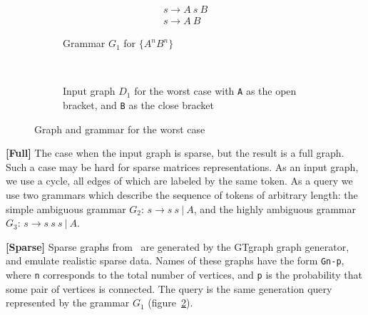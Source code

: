 \begin{figure}[h]
    \centering
    \begin{subfigure}[b]{0.20\textwidth}
        \centering
        \[
         \begin{array}{l}
           s \rightarrow A \ s \ B \\
           s \rightarrow A \ B
         \end{array}
         \]
        \caption{Grammar $G_1$ for $\{A^n B^n\}$}
    \end{subfigure}%
    ~\quad
    \begin{subfigure}[b]{0.24\textwidth}
        \centering

        \caption{Input graph $D_1$ for the worst case with \texttt{A} as the open bracket, and \texttt{B} as the close bracket}
        \label{fig:worstCaseGraph}
    \end{subfigure}%
    \caption{Graph and grammar for the worst case}
    \label{fig:grammar_example}
\end{figure}


\textbf{[Full]} The case when the input graph is sparse, but the result is a full graph.
Such a case may be hard for sparse matrices representations.
As an input graph, we use a cycle, all edges of which are labeled by the same token.
As a query we use two grammars which describe the sequence of tokens of arbitrary length: the simple ambiguous grammar $G_2$: $s \rightarrow  s \ s \ | \ A$,  and the highly ambiguous grammar $G_3$: $s \rightarrow s \ s \ s \ | \ A$.

\textbf{[Sparse]} Sparse graphs from~\cite{fan2018scaling} are generated by the GTgraph graph generator, and emulate realistic sparse data.
Names of these graphs have the form \texttt{Gn-p}, where \texttt{n} corresponds to the total number of vertices, and \texttt{p} is the probability that some pair of vertices is connected.
The query is the same generation query represented by the grammar $G_1$ (figure~\ref{fig:grammar_example}).

